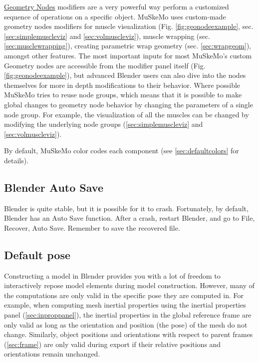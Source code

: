 \documentclass{article}
\begin{document}
\href{https://docs.blender.org/manual/en/latest/modeling/geometry_nodes/index.html}{Geometry Nodes} modifiers are a very powerful way perform a customized sequence of operations on a specific object. MuSkeMo uses custom-made geometry nodes modifiers for muscle visualization (Fig. \ref{fig:geonodeexample}, sec. \ref{sec:simplemuscleviz} and \ref{sec:volmuscleviz}), muscle wrapping (sec.  \ref{sec:musclewrapping}), creating parametric wrap geometry (sec. \ref{sec:wrapgeom}), amongst other features. The most important inputs for most MuSkeMo's custom Geometry nodes are accessible from the modifier panel itself  (Fig. \ref{fig:geonodeexample}), but advanced Blender users can also dive into the nodes themselves for more in depth modifications to their behavior. Where possible MuSkeMo tries to reuse node groups, which means that it is possible to make global changes to geometry node behavior by changing the parameters of a single node group. For example, the visualization of all the muscles can be changed by modifying the underlying node groups (\ref{sec:simplemuscleviz} and \ref{sec:volmuscleviz}).

By default, MuSkeMo color codes each component (see \ref{sec:defaultcolors} for details).


\subsection{Blender Auto Save}

Blender is quite stable, but it is possible for it to crash. Fortunately, by default, Blender has an Auto Save function. After a crash, restart Blender, and go to File, Recover, Auto Save. Remember to save the recovered file.

\subsection{Default pose}
\label{sec:defaultpose}
Constructing a model in Blender provides you with a lot of freedom to interactively repose model elements during model construction. However, many of the computations are only valid in the specific pose they are computed in. For example, when computing mesh inertial properties using the inertial properties panel (\ref{sec:inproppanel}), the inertial properties in the global reference frame are only valid as long as the orientation and position (the pose) of the mesh do not change. Similarly, object positions and orientations with respect to parent frames (\ref{sec:frame}) are only valid during export if their relative positions and orientations remain unchanged. 
\end{document}
